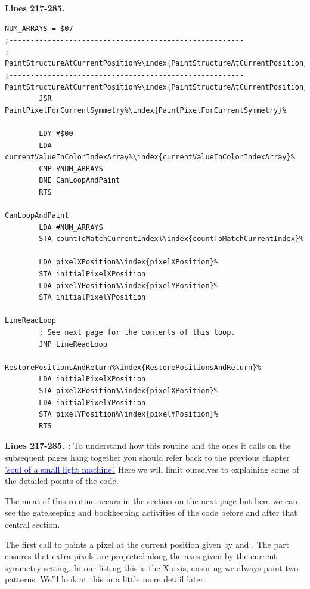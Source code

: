 \clearpage
\textbf{Lines 217-285. }
\begin{lstlisting}[caption = The routine responsible for orchestrating the pattern painting.,escapechar=\%]
NUM_ARRAYS = $07
;-------------------------------------------------------
; PaintStructureAtCurrentPosition%\index{PaintStructureAtCurrentPosition}%
;-------------------------------------------------------
PaintStructureAtCurrentPosition%\index{PaintStructureAtCurrentPosition}%   
        JSR PaintPixelForCurrentSymmetry%\index{PaintPixelForCurrentSymmetry}%

        LDY #$00
        LDA currentValueInColorIndexArray%\index{currentValueInColorIndexArray}%
        CMP #NUM_ARRAYS
        BNE CanLoopAndPaint
        RTS 

CanLoopAndPaint   
        LDA #NUM_ARRAYS
        STA countToMatchCurrentIndex%\index{countToMatchCurrentIndex}%
       
        LDA pixelXPosition%\index{pixelXPosition}%
        STA initialPixelXPosition
        LDA pixelYPosition%\index{pixelYPosition}%
        STA initialPixelYPosition

LineReadLoop   
        ; See next page for the contents of this loop.
        JMP LineReadLoop

RestorePositionsAndReturn%\index{RestorePositionsAndReturn}%   
        LDA initialPixelXPosition
        STA pixelXPosition%\index{pixelXPosition}%
        LDA initialPixelYPosition
        STA pixelYPosition%\index{pixelYPosition}%
        RTS 

\end{lstlisting}
\clearpage

\textbf{Lines 217-285. :} To understand how this routine and the ones it calls on the subsequent pages hang together you should refer
back to the previous chapter 
\hyperref[sec:listing_pattern]{\textcolor{blue}{'soul of a small light machine'.}} 
Here we will limit ourselves to explaining some of the detailed points of the code.

The meat of this routine occurs in the  section on the next page but here we can see the
gatekeeping and bookkeeping activities of the code before and after that central section. 

The first call to  paints a pixel at the current position given by 
 and . The  part ensures that extra
pixels are projected along the axes given by the current symmetry setting. In our listing this is the
X-axis, ensuring we always paint two patterns. We'll look at this in a little more detail later.

